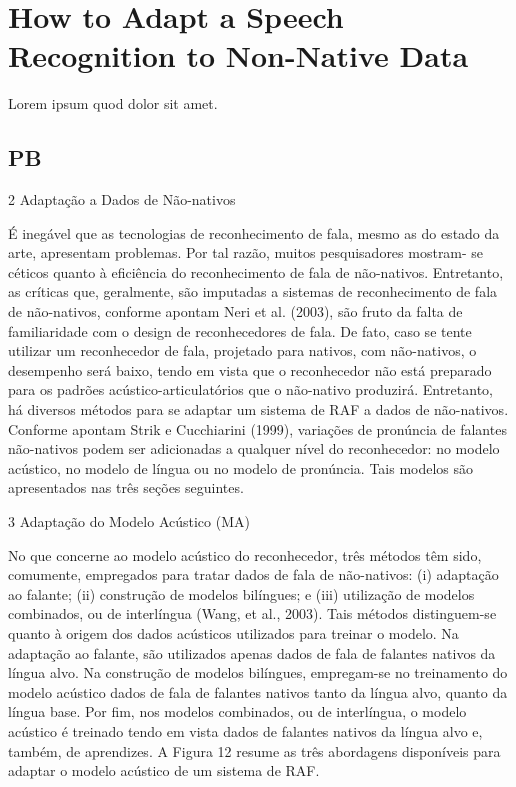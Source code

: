 \chapter{How to Adapt a Speech Recognition to Non-Native Data}\label{ch:how-to-adapt}
Lorem ipsum quod dolor sit amet.

\section{PB}


2 Adapta\c{c}\~ao a Dados de N\~ao-nativos

\'E ineg\'avel que as tecnologias de reconhecimento de fala, mesmo as do
estado da arte, apresentam problemas. Por tal raz\~ao, muitos
pesquisadores mostram- se c\'eticos quanto à efici\^encia do reconhecimento
de fala de n\~ao-nativos. Entretanto, as cr\'iticas que, geralmente, s\~ao
imputadas a sistemas de reconhecimento de fala de n\~ao-nativos, conforme
apontam Neri et al. (2003), s\~ao fruto da falta de familiaridade com o
design de reconhecedores de fala. De fato, caso se tente utilizar um
reconhecedor de fala, projetado para nativos, com n\~ao-nativos, o
desempenho ser\'a baixo, tendo em vista que o reconhecedor n\~ao est\'a
preparado para os padr\~oes ac\'ustico-articulat\'orios que o n\~ao-nativo
produzir\'a. Entretanto, h\'a diversos m\'etodos para se adaptar um sistema de
RAF a dados de n\~ao-nativos. Conforme apontam Strik e Cucchiarini (1999),
varia\c{c}\~oes de pron\'uncia de falantes n\~ao-nativos podem ser adicionadas a
qualquer n\'ivel do reconhecedor: no modelo ac\'ustico, no modelo de l\'ingua
ou no modelo de pron\'uncia. Tais modelos s\~ao apresentados nas tr\^es se\c{c}\~oes
seguintes.

3 Adapta\c{c}\~ao do Modelo Ac\'ustico (MA)

No que concerne ao modelo ac\'ustico do reconhecedor, tr\^es m\'etodos t\^em
sido, comumente, empregados para tratar dados de fala de n\~ao-nativos:
(i) adapta\c{c}\~ao ao falante; (ii) constru\c{c}\~ao de modelos bil\'ingues; e (iii)
utiliza\c{c}\~ao de modelos combinados, ou de interl\'ingua (Wang, et al.,
2003). Tais m\'etodos distinguem-se quanto à origem dos dados ac\'usticos
utilizados para treinar o modelo. Na adapta\c{c}\~ao ao falante, s\~ao
utilizados apenas dados de fala de falantes nativos da l\'ingua alvo. Na
constru\c{c}\~ao de modelos bil\'ingues, empregam-se no treinamento do modelo
ac\'ustico dados de fala de falantes nativos tanto da l\'ingua alvo, quanto
da l\'ingua base. Por fim, nos modelos combinados, ou de interl\'ingua, o
modelo ac\'ustico \'e treinado tendo em vista dados de falantes nativos da
l\'ingua alvo e, tamb\'em, de aprendizes. A Figura 12 resume as tr\^es
abordagens dispon\'iveis para adaptar o modelo ac\'ustico de um sistema de
RAF.

